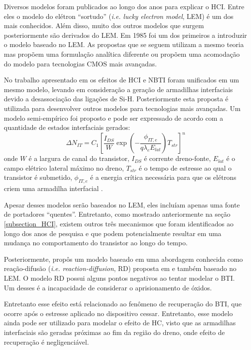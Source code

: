 Diversos modelos foram publicados ao longo dos anos para explicar o HCI.  Entre eles o modelo do elétron ``sortudo'' (\textit{i.e. lucky electron model}, LEM) é um dos mais conhecidos. Além disso, muito dos outros modelos que surgem posteriormente são derivados do LEM. Em 1985 \cite{ChenmingHu1985} foi um dos primeiros a introduzir o modelo baseado no LEM. As propostas que se seguem utilizam a mesmo teoria mas propõem uma formulação analítica diferente ou propõem uma acomodação do modelo para tecnologias CMOS mais avançadas.

No trabalho apresentado em \cite{Kufluoglu} os efeitos de HCI e NBTI foram unificados em um mesmo modelo, levando em consideração a geração de armadilhas interfaciais devido a desassociação das ligações de Si-H. Posteriormente esta proposta é utilizada para desenvolver outros modelos para tecnologias mais avançadas. Um modelo semi-empírico foi proposto e pode ser expressado de acordo com a quantidade de estados interfaciais gerados:
\begin{equation}\label{eq:HCI_semi_empircal_states}
\Delta N_{IT}=C_1\left[\frac{I_{DS}}{W}\exp\left(-\frac{\phi_{IT,e}}{q\lambda_eE_{lat}}\right)T_{str}\right]^n
\end{equation}
onde $W$ é a largura de canal do transistor, $I_{DS}$ é corrente dreno-fonte, $E_{lat}$ é o campo elétrico lateral máximo no dreno, $T_{str}$ é o tempo de estresse ao qual o transistor é submetido, $\phi_{IT,e}$ é a energia crítica necessária para que os elétrons criem uma armadilha interfacial \cite{Maricau2013}. 

Apesar desses modelos serão baseados no LEM, eles incluíam apenas uma fonte de portadores ``quentes''. Entretanto, como mostrado anteriormente na seção \ref{subsection_HCI}, existem outros três mecanismos que foram identificados ao longo dos anos de pesquisa e que podem potencialmente resultar em uma mudança no comportamento do transistor ao longo do tempo.

Posteriormente, \cite{Maricau2013} propôs um modelo baseado em uma abordagem conhecida como reação-difusão (\textit{i.e. reaction-diffusion}, RD) proposta em \cite{Kufluoglu} e também baseado no LEM. O modelo RD possui alguns pontos negativos ao tentar modelar o BTI. Um desses é a incapacidade de considerar o aprisionamento de óxidos.

Entretanto esse efeito está relacionado ao fenômeno de recuperação do BTI, que ocorre após o estresse aplicado no dispositivo cessar. Entretanto, esse modelo ainda pode ser utilizado para modelar o efeito de HC, visto que as armadilhas interfaciais são geradas próximas ao fim da região do dreno, onde efeito de recuperação é negligenciável.

